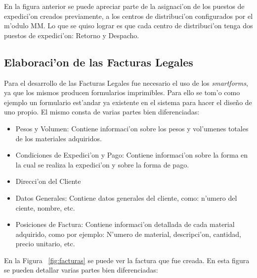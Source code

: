 	En la figura anterior se puede apreciar parte de la asignaci'on de los puestos de expedici'on creados previamente, a los centros de distribuci'on configurados por el m'odulo MM. Lo que se quiso lograr es que cada centro de distribuci'on tenga dos puestos de expedici'on: Retorno y Despacho.

\subsection{Elaboraci'on de las Facturas Legales}
	Para el desarrollo de las Facturas Legales fue necesario el uso de los \textit{smartforms}, ya que los mismos producen formularios imprimibles. Para ello se tom'o como ejemplo un formulario est'andar ya existente en el sistema para hacer el dise\~no de uno propio. El mismo consta de varias partes bien diferenciadas:
\begin{itemize}
\item Pesos y Volumen: Contiene informaci'on sobre los pesos y vol'umenes totales de los materiales adquiridos.
\item Condiciones de Expedici'on y Pago: Contiene informaci'on sobre la forma en la cual se realiza la expedici'on y sobre la forma de pago.
\item Direcci'on del Cliente
\item Datos Generales: Contiene datos generales del cliente, como: n'umero del ciente, nombre, etc.
\item Posiciones de Factura: Contiene informaci'on detallada de cada material adquirido, como por ejemplo: N'umero de material, descripci'on, cantidad, precio unitario, etc.
\end{itemize}
	En la Figura  ~\ref{fig:facturas} se puede ver la factura que fue creada. En esta figura se pueden detallar varias partes bien diferenciadas:
